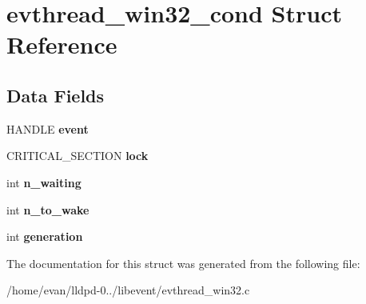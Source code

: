 \section{evthread\-\_\-win32\-\_\-cond \-Struct \-Reference}
\label{structevthread__win32__cond}
\subsection*{\-Data \-Fields}
\begin{DoxyCompactItemize}
\item 
\-H\-A\-N\-D\-L\-E {\bfseries event}\label{structevthread__win32__cond_a565d71e8ad36560cb72c7f6edd56ba63}

\item 
\-C\-R\-I\-T\-I\-C\-A\-L\-\_\-\-S\-E\-C\-T\-I\-O\-N {\bfseries lock}\label{structevthread__win32__cond_a12dbcf00646e16fcb3fbc09e072746b0}

\item 
int {\bfseries n\-\_\-waiting}\label{structevthread__win32__cond_a34ccdd6afbef40952cc313bbfa6f9d88}

\item 
int {\bfseries n\-\_\-to\-\_\-wake}\label{structevthread__win32__cond_a5cad957d8202552cbc72b0f3fa5029c6}

\item 
int {\bfseries generation}\label{structevthread__win32__cond_aad8eab95bc6ae0373f10cb2a0bdeb88c}

\end{DoxyCompactItemize}


\-The documentation for this struct was generated from the following file\-:\begin{DoxyCompactItemize}
\item 
/home/evan/lldpd-\/0../libevent/evthread\-\_\-win32.\-c\end{DoxyCompactItemize}
